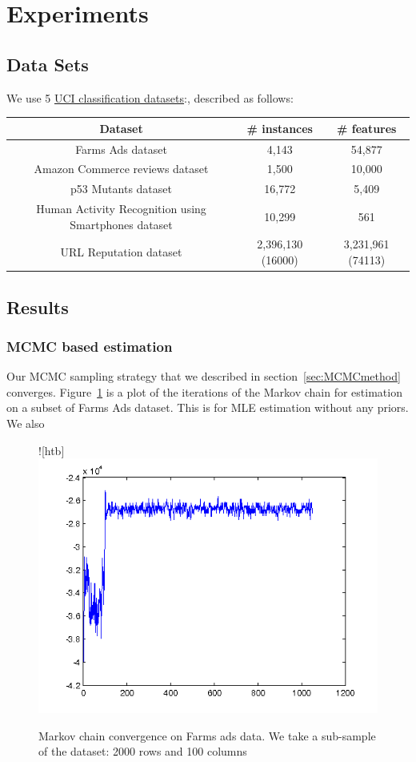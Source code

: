 \section{Experiments}
\label{sec:experiments}

\subsection{Data Sets}


We use 5 \href{http://archive.ics.uci.edu/ml/datasets.html}{UCI classification
datasets}:, described as follows:

\begin{tabular}{| c | c |  c |}
\hline
Dataset & \# instances & \# features \\
\hline
Farms Ads dataset & 4,143 & 54,877 \\
\hline
Amazon Commerce reviews dataset & 1,500 & 10,000 \\
\hline
p53 Mutants dataset & 16,772 & 5,409 \\
\hline
Human Activity Recognition using Smartphones dataset & 10,299 & 561\\
\hline
URL Reputation dataset\footnotemark[1] & 2,396,130 (16000) & 3,231,961 (74113) \\
\hline
\end{tabular}


\subsection{Results}

\subsubsection{MCMC based estimation}
Our MCMC sampling strategy that we described in section~\ref{sec:MCMCmethod}
converges. Figure~\ref{fig:MCMCconverge} is a plot of the iterations of the Markov 
chain for estimation on a subset of Farms Ads dataset. This is for MLE
estimation without any priors. We also 

\begin{figure}![htb]
\includegraphics[width=1\textwidth]{samplingConvergence.png}
\caption{Markov chain convergence on Farms ads data. We take a sub-sample of
the dataset: 2000 rows and 100 columns}
\label{fig:MCMCconverge}
\end{figure}
